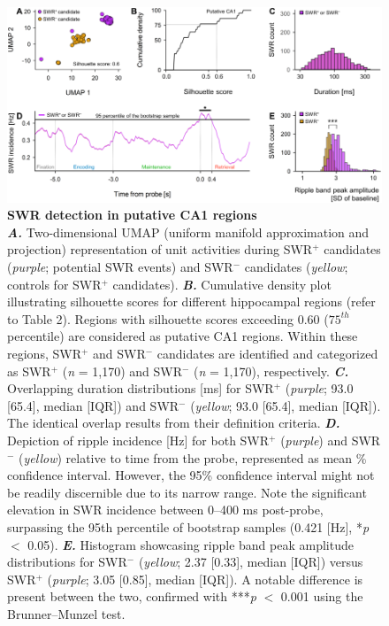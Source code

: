 \documentclass[final,3p,times,twocolumn]{elsarticle}
\begin{document}
        \clearpage
        \begin{figure}[ht]
        	\centering
            \includegraphics[width=1\textwidth]{./media/figures/.png/Figure_ID_04.png}
        	\caption{\textbf{
SWR detection in putative CA1 regions
}
\smallskip
\\
\textbf{\textit{A.}} Two-dimensional UMAP (uniform manifold approximation and projection)\cite{mcinnes_umap_2018} representation of unit activities during SWR$^+$ candidates (\textit{purple}; potential SWR events) and SWR$^-$ candidates (\textit{yellow}; controls for SWR$^+$ candidates). \textbf{\textit{B.}}  Cumulative density plot illustrating silhouette scores for different hippocampal regions (refer to Table 2). Regions with silhouette scores exceeding 0.60 ($75^{th}$ percentile) are considered as putative CA1 regions. Within these regions, SWR$^+$ and SWR$^-$ candidates are identified and categorized as SWR$^+$ (\textit{n} = 1,170) and SWR$^-$ (\textit{n} = 1,170), respectively. \textbf{\textit{C.}}  Overlapping duration distributions [ms] for SWR$^+$ (\textit{purple}; 93.0 [65.4], median [IQR]) and SWR$^-$ (\textit{yellow}; 93.0 [65.4], median [IQR]). The identical overlap results from their definition criteria. \textbf{\textit{D.}}  Depiction of ripple incidence [Hz] for both SWR$^+$ (\textit{purple}) and SWR$^-$ (\textit{yellow}) relative to time from the probe, represented as mean \% confidence interval. However, the 95\% confidence interval might not be readily discernible due to its narrow range. Note the significant elevation in SWR incidence between 0--400 ms post-probe, surpassing the 95th percentile of bootstrap samples (0.421 [Hz], *\textit{p} $<$ 0.05). \textbf{\textit{E.}}  Histogram showcasing ripple band peak amplitude distributions for SWR$^-$ (\textit{yellow}; 2.37 [0.33], median [IQR]) versus SWR$^+$ (\textit{purple}; 3.05 [0.85], median [IQR]). A notable difference is present between the two, confirmed with ***\textit{p} $<$ 0.001 using the Brunner--Munzel test.
}
        	\label{fig:04}
        \end{figure}
\end{document}
